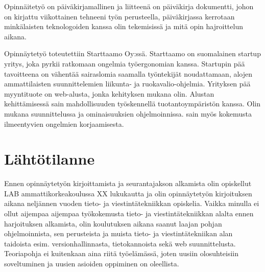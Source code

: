 \documentclass[11pt,a4paper,titlepage,oneside]{article}
\begin{document}
Opinnäitetyö on päiväkirjamallinen ja liitteenä on päiväkirja dokumentti, 
johon on kirjattu viikottainen tehneeni työn perusteella, päiväkirjassa kerrotaan
minkälaisten teknologoiden kanssa olin tekemisissä ja mitä opin hajroittelun aikana.
\medskip


Opinnäytetyö toteutettiin Starttaamo Oy:ssä. Starttaamo on suomalainen startup yritys, joka pyrkii ratkomaan ongelmia työergonomian kanssa.
Startupin pää tavoitteena on vähentää sairaslomia saamalla työntekijät noudattamaan, alojen ammattilaisten suunnittelemien liikunta- ja ruokavalio-ohjelmia. 
Yrityksen pää myyntituote on web-alusta, jonka kehityksen mukana olin.
%
Alustan kehittämisessä sain mahdollisuuden työskennellä tuotantoympäristön kanssa.
Olin mukana suunnittelussa ja ominaisuuksien ohjelmoinnissa. sain myös kokemusta ilmeentyvien ongelmien korjaamisesta.

\medskip






\newpage
\section{Lähtötilanne}         %











Ennen opinnäytetyön kirjoittamista ja seurantajakson alkamista olin opiskellut LAB ammattikorkeakoulussa XX lukukautta ja
olin opinnäytetyön kirjoituksen aikana neljännen vuoden tieto- ja viestintätekniikkan opiskelia.
Vaikka minulla ei ollut aijempaa aijempaa työkokemusta tieto- ja viestintätekniikkan alalta ennen harjoituksen alkamista,
olin koulutuksen aikana saanut laajan pohjan ohjelmoinnista,
sen perusteista ja muista tieto- ja viestintätekniikan alan taidoista esim. versionhallinnasta, tietokannoista sekä web suunnittelusta.
Teoriapohja ei kuitenkaan aina riitä työelämässä, joten uusiin olosuhteisiin soveltuminen ja uusien asioiden oppiminen on oleellista.
\medskip
\end{document}
